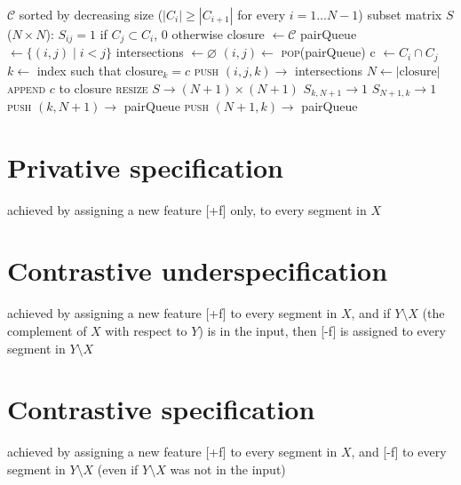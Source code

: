 \documentclass[11pt, oneside]{article}   	%
\begin{document}
\vspace{\baselineskip} \noindent \begin{algorithmic}
    \REQUIRE $\mathcal C$ sorted by decreasing size ($|C_i| \geq |C_{i+1}| $ for every $i = 1 \ldots N-1$)
    \REQUIRE subset matrix $S$ ($N \times N$): $S_{ij} = 1$ if $C_j \subset C_i$, $0$ otherwise
    \STATE
    \STATE closure $\leftarrow \mathcal C$
    \STATE pairQueue $\leftarrow \{ (i, j) \; | \; i < j \}$
    \STATE intersections $\leftarrow \varnothing$
    \STATE
        \STATE $(i, j) \leftarrow$ \textsc{pop}(pairQueue)
            \STATE c $\leftarrow C_i \cap C_j$
                \STATE $k \leftarrow$ index such that $\text{closure}_k = c$
                \STATE \textsc{push} $(i, j, k) \rightarrow$ intersections
                \STATE $N \leftarrow |\text{closure}|$
                \STATE \textsc{append} $c$ to closure
                \STATE \textsc{resize} $S \rightarrow (N+1) \times (N+1)$
                        \STATE $S_{k,N+1} \rightarrow 1$
                    \ENDIF
                     \STATE $S_{N+1,k} \rightarrow 1$ \ENDIF
                    \STATE \textsc{push} $(k, N+1) \rightarrow$ pairQueue
                    \STATE \textsc{push} $(N+1,k) \rightarrow$ pairQueue
                \ENDFOR
            \ENDIF
        \ENDIF
    \ENDWHILE
\end{algorithmic}

\section{Privative specification}
achieved by assigning a new feature [+f] only, to every segment in $X$

\section{Contrastive underspecification}
achieved by assigning a new feature [+f] to every segment in $X$, and if $Y \setminus X$ (the complement of $X$ with respect to $Y$) is in the input, then [-f] is assigned to every segment in $Y \setminus X$

\section{Contrastive specification}
achieved by assigning a new feature [+f] to every segment in $X$, and [-f] to every segment in $Y \setminus X$ (even if $Y \setminus X$ was not in the input)
\end{document}
